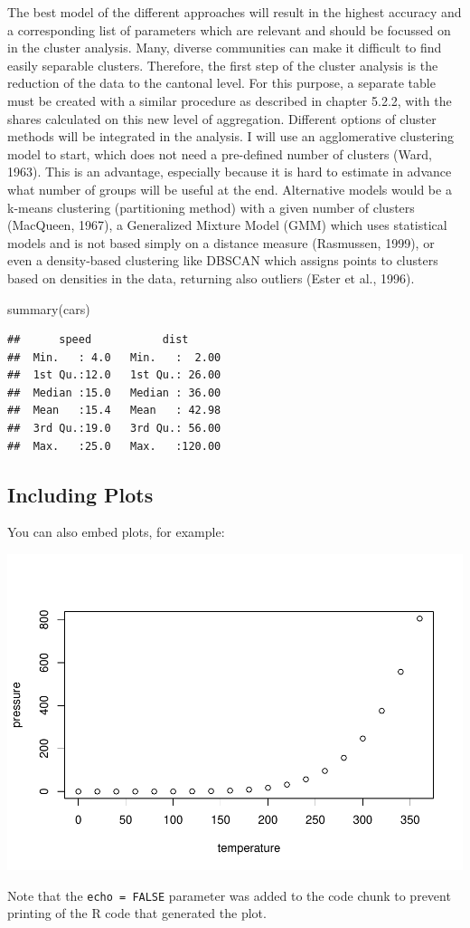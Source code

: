 \documentclass[
]{article}
\newenvironment{Shaded}{\begin{snugshade}}{\end{snugshade}}
\newcommand{\FunctionTok}[1]{\textcolor[rgb]{0.00,0.00,0.00}{#1}}
\newcommand{\NormalTok}[1]{#1}
\begin{document}
The best model of the different approaches will result in the highest
accuracy and a corresponding list of parameters which are relevant and
should be focussed on in the cluster analysis. Many, diverse communities
can make it difficult to find easily separable clusters. Therefore, the
first step of the cluster analysis is the reduction of the data to the
cantonal level. For this purpose, a separate table must be created with
a similar procedure as described in chapter 5.2.2, with the shares
calculated on this new level of aggregation. Different options of
cluster methods will be integrated in the analysis. I will use an
agglomerative clustering model to start, which does not need a
pre-defined number of clusters (Ward, 1963). This is an advantage,
especially because it is hard to estimate in advance what number of
groups will be useful at the end. Alternative models would be a k-means
clustering (partitioning method) with a given number of clusters
(MacQueen, 1967), a Generalized Mixture Model (GMM) which uses
statistical models and is not based simply on a distance measure
(Rasmussen, 1999), or even a density-based clustering like DBSCAN which
assigns points to clusters based on densities in the data, returning
also outliers (Ester et al., 1996).

\begin{Shaded}
\begin{Highlighting}[]
\FunctionTok{summary}\NormalTok{(cars)}
\end{Highlighting}
\end{Shaded}

\begin{verbatim}
##      speed           dist       
##  Min.   : 4.0   Min.   :  2.00  
##  1st Qu.:12.0   1st Qu.: 26.00  
##  Median :15.0   Median : 36.00  
##  Mean   :15.4   Mean   : 42.98  
##  3rd Qu.:19.0   3rd Qu.: 56.00  
##  Max.   :25.0   Max.   :120.00
\end{verbatim}

\hypertarget{including-plots}{%
\subsection{Including Plots}\label{including-plots}}

You can also embed plots, for example:

\includegraphics{Lin_Mod_Clus_Anal_files/figure-latex/pressure-1.pdf}

Note that the \texttt{echo\ =\ FALSE} parameter was added to the code
chunk to prevent printing of the R code that generated the plot.
\end{document}
